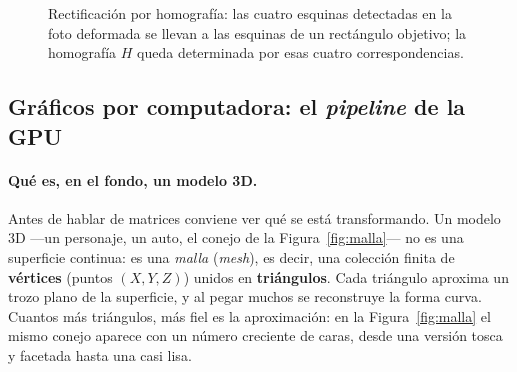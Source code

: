 \documentclass[11pt,a4paper]{article}
\begin{document}
\begin{figure}[H]
\centering
{}
\caption{Rectificación por homografía: las cuatro esquinas detectadas en la
foto deformada se llevan a las esquinas de un rectángulo objetivo; la
homografía $H$ queda determinada por esas cuatro correspondencias.}
\label{fig:rectif}
\end{figure}

\subsection{Gráficos por computadora: el \emph{pipeline} de la GPU}

\paragraph{Qué es, en el fondo, un modelo 3D.}
Antes de hablar de matrices conviene ver qué se está transformando. Un
modelo 3D —un personaje, un auto, el conejo de la
Figura~\ref{fig:malla}— no es una superficie continua: es una
\emph{malla} (\emph{mesh}), es decir, una colección finita de
\textbf{vértices} (puntos $(X,Y,Z)$) unidos en \textbf{triángulos}. Cada
triángulo aproxima un trozo plano de la superficie, y al pegar muchos se
reconstruye la forma curva. Cuantos más triángulos, más fiel es la
aproximación: en la Figura~\ref{fig:malla} el mismo conejo aparece con un
número creciente de caras, desde una versión tosca y facetada hasta una
casi lisa.
\end{document}

